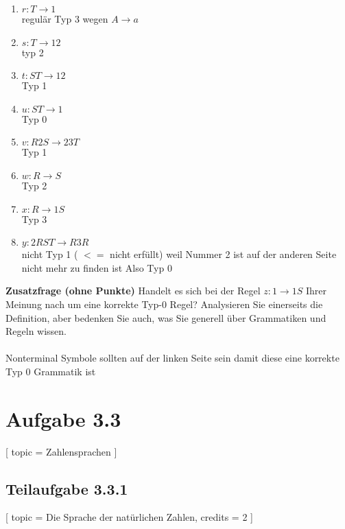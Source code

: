\documentclass[12pt]{article}
\begin{document}
     
 \begin{enumerate} 
 \item $r: T \rightarrow 1$ \\ regulär Typ 3 wegen $A \rightarrow a$
 \item $s: T \rightarrow 12$ \\ typ 2 
 \item $t: ST \rightarrow 12$\\  Typ 1
 \item $u: ST \rightarrow 1$ \\ Typ 0 
 \item $v: R2S \rightarrow 23T$ \\  Typ 1
 \item $w: R \rightarrow S$\\ Typ 2
 \item $x: R \rightarrow 1S$ \\ Typ 3
 \item $y: 2RST \rightarrow R3R$ \\ nicht Typ 1 ( $< =$ nicht erfüllt) weil Nummer 2 ist auf der anderen Seite nicht mehr zu finden ist Also Typ 0
 \end{enumerate} 
  
 \textbf{Zusatzfrage (ohne Punkte)} Handelt es sich bei der Regel $z: 1 \rightarrow 1S$ Ihrer Meinung nach um eine korrekte Typ-0 Regel? Analysieren Sie einerseits die Definition, aber bedenken Sie auch, was Sie generell über Grammatiken und Regeln wissen.  
  \\\\
   Nonterminal Symbole sollten auf der linken Seite sein damit diese eine korrekte Typ 0 Grammatik ist 
  
  
  
 \section*{Aufgabe 3.3} [ 
 topic = Zahlensprachen 
 ] 
  
 \subsection*{Teilaufgabe 3.3.1} [ 
 topic = Die Sprache der natürlichen Zahlen, 
 credits = 2 
 ] 
  
\end{document}
